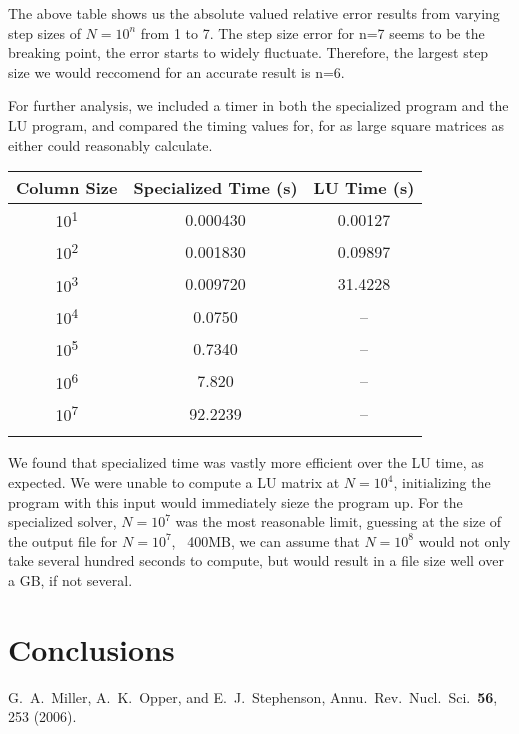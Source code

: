 \documentclass[10pt,showpacs,preprintnumbers,footinbib,amsmath,amssymb,aps,prl,twocolumn,groupedaddress,superscriptaddress,showkeys]{revtex4-1}
\begin{document}
	The above table shows us the absolute valued relative error results from varying step sizes of $N=10^{n}$ from 1 to 7. The step size error for n=7 seems to be the breaking point, the error starts to widely fluctuate. Therefore, the largest step size we would reccomend for an accurate result is n=6.  


	For further analysis, we included a timer in both the specialized program and the LU program, and compared the timing values for, for as large square matrices as either could reasonably calculate.

	\begin{center}
		\begin{tabular}{ccc}
			\hline \hline
			Column Size & Specialized Time (s) & LU Time (s)\\
			\hline
			10\textsuperscript{1} & 0.000430 & 0.00127\\
			10\textsuperscript{2} & 0.001830 &  0.09897\\
			10\textsuperscript{3} & 0.009720 & 31.4228\\
			10\textsuperscript{4} & 0.0750       &  --\\
			10\textsuperscript{5} & 0.7340  & --\\
			10\textsuperscript{6} & 7.820  & --\\
			10\textsuperscript{7} & 92.2239  & --\\
			\hline
			\label{timingtable}
		\end{tabular}
	\end{center}
	We found that specialized time was vastly more efficient over the LU time, as expected. We were unable to compute a LU matrix at $N=10^{4}$, initializing the program with this input would immediately sieze the program up. For the specialized solver, $N=10^{7}$ was the most reasonable limit, guessing at the size of the output file for $N=10^{7}$, ~400MB, we can assume that $N=10^{8}$ would not only take several hundred seconds to compute, but would result in a file size well over a GB, if not several. 	

\section{Conclusions}

\begin{thebibliography}{99}
 G.~A.~Miller, A.~K.~Opper, and E.~J.~Stephenson, Annu.~Rev.~Nucl.~Sci.~{\bf 56}, 253 (2006).
\end{thebibliography}
\end{document}
